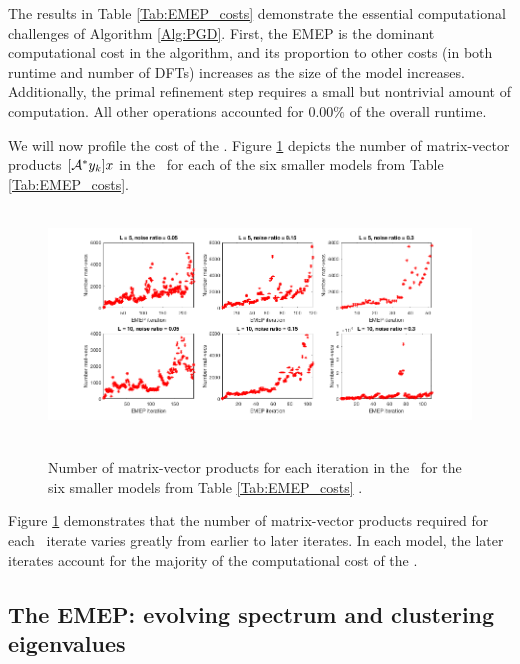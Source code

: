 The results in Table \ref{Tab:EMEP_costs} demonstrate the essential computational challenges of Algorithm \ref{Alg:PGD}.  First, the EMEP is the dominant computational cost in the algorithm, and its proportion to other costs (in both runtime and number of DFTs) increases as the size of the model increases.  Additionally, the primal refinement step requires a small but nontrivial amount of computation.  All other operations accounted for $0.00\%$ of the overall runtime. 



We will now profile the cost of the \emep.
Figure \ref{Fig:EMEP_costs_num_mat_vecs} depicts the number of matrix-vector products $[{\mathcal A}^*y_k]x$ in the \emep \ for each of the six smaller models from Table \ref{Tab:EMEP_costs}. 

\begin{figure}[H]
\centering
\hbox{\hspace{-1.9cm} \includegraphics[scale=0.6]{EMEP_costs_num_mat_vecs} }\vspace{-0.4cm}
	\caption{Number of matrix-vector products for each iteration in the \emep \ for the six smaller models from Table \ref{Tab:EMEP_costs}	.}
\label{Fig:EMEP_costs_num_mat_vecs}
\end{figure}

Figure \ref{Fig:EMEP_costs_num_mat_vecs} demonstrates that the number of matrix-vector products required for each \emep \ iterate varies greatly from earlier to later iterates.  In each model, the later iterates account for the majority of the computational cost of the \emep.  



\subsection{The EMEP: evolving spectrum and clustering eigenvalues} 	\label{Subsubsec:evol_mats-EMEP_spectrum_and_clustering}


